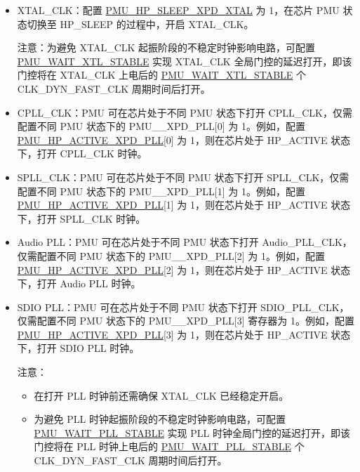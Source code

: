 \documentclass[main\_\_CN.tex]{subfiles}
\begin{document}
\begin{itemize}
\item XTAL\_CLK：配置 \hyperref[fielddesc:PMUHPSLEEPXPDXTAL]{PMU\_HP\_SLEEP\_XPD\_XTAL} 为 1，在芯片 PMU 状态切换至 HP\_SLEEP 的过程中，开启 XTAL\_CLK。

注意：为避免 XTAL\_CLK 起振阶段的不稳定时钟影响电路，可配置 \hyperref[fielddesc:PMUWAITXTLSTABLE]{PMU\_WAIT\_XTL\_STABLE} 实现 XTAL\_CLK 全局门控的延迟打开，即该门控将在 XTAL\_CLK 上电后的 \hyperref[fielddesc:PMUWAITXTLSTABLE]{PMU\_WAIT\_XTL\_STABLE} 个 CLK\_DYN\_FAST\_CLK 周期时间后打开。

\item CPLL\_CLK：PMU 可在芯片处于不同 PMU 状态下打开 CPLL\_CLK，仅需配置不同 PMU 状态下的 PMU\_\_XPD\_PLL[0] 为 1。例如，配置 \hyperref[fielddesc:PMUHPACTIVEXPDPLL]{PMU\_HP\_ACTIVE\_XPD\_PLL}[0] 为 1，则在芯片处于 HP\_ACTIVE 状态下，打开 CPLL\_CLK 时钟。

\item SPLL\_CLK：PMU 可在芯片处于不同 PMU 状态下打开 SPLL\_CLK，仅需配置不同 PMU 状态下的 PMU\_\_XPD\_PLL[1] 为 1。例如，配置 \hyperref[fielddesc:PMUHPACTIVEXPDPLL]{PMU\_HP\_ACTIVE\_XPD\_PLL}[1] 为 1，则在芯片处于 HP\_ACTIVE 状态下，打开 SPLL\_CLK 时钟。

\item Audio PLL：PMU 可在芯片处于不同 PMU 状态下打开 Audio\_PLL\_CLK，仅需配置不同 PMU 状态下的 PMU\_\_XPD\_PLL[2] 为 1。例如，配置 \hyperref[fielddesc:PMUHPACTIVEXPDPLL]{PMU\_HP\_ACTIVE\_XPD\_PLL}[2] 为 1，则在芯片处于 HP\_ACTIVE 状态下，打开 Audio PLL 时钟。

\item SDIO PLL：PMU 可在芯片处于不同 PMU 状态下打开 SDIO\_PLL\_CLK，仅需配置不同 PMU 状态下的 PMU\_\_XPD\_PLL[3] 寄存器为 1。例如，配置 \hyperref[fielddesc:PMUHPACTIVEXPDPLL]{PMU\_HP\_ACTIVE\_XPD\_PLL}[3] 为 1，则在芯片处于 HP\_ACTIVE 状态下，打开 SDIO PLL 时钟。

注意：
\begin{itemize}
\item 在打开 PLL 时钟前还需确保 XTAL\_CLK 已经稳定开启。
\item 为避免 PLL 时钟起振阶段的不稳定时钟影响电路，可配置 \hyperref[fielddesc:PMUWAITPLLSTABLE]{PMU\_WAIT\_PLL\_STABLE} 实现 PLL 时钟全局门控的延迟打开，即该门控将在 PLL 时钟上电后的 \hyperref[fielddesc:PMUWAITPLLSTABLE]{PMU\_WAIT\_PLL\_STABLE} 个CLK\_DYN\_FAST\_CLK 周期时间后打开。
\end{itemize}
\end{itemize}
\end{document}
